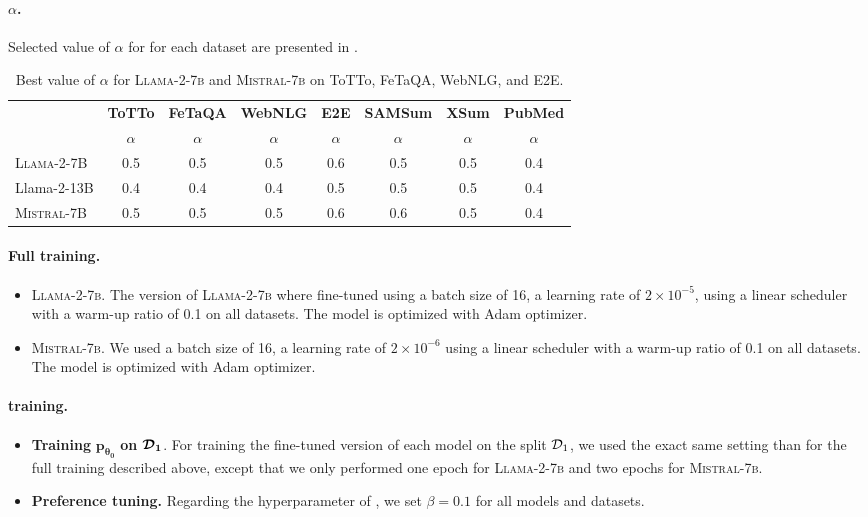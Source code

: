 \paragraph{\scope $\alpha$.} Selected value of $\alpha$ for \scope for each dataset are presented in .
\begin{table}[h!]
\centering

\begin{tabular}{lccccccc}
    & \textbf{ToTTo} & \textbf{FeTaQA} & \textbf{WebNLG} & \textbf{E2E} & \textbf{SAMSum} & \textbf{XSum} & \textbf{PubMed} \\
    & $\alpha$ & $\alpha$ & $\alpha$ & $\alpha$ & $\alpha$ & $\alpha$ & $\alpha$ \\
    \midrule
    \textsc{Llama-2-7B} & 0.5 & 0.5 & 0.5 & 0.6 & 0.5 & 0.5 & 0.4 \\
    Llama-2-13B & 0.4 & 0.4 & 0.4 & 0.5 & 0.5 & 0.5 & 0.4 \\
    \textsc{Mistral-7B} & 0.5 & 0.5 & 0.5 & 0.6 & 0.6 & 0.5 & 0.4 \\
    \midrule
\end{tabular}


\caption{Best \scope value of $\alpha$ for \textsc{Llama-2-7b} and \textsc{Mistral-7b} on ToTTo, FeTaQA, WebNLG, and E2E.}
\label{tab:scope-hyperparameter}
\end{table}

\paragraph{Full \sft training.}
\begin{itemize}
    \item \textsc{Llama-2-7b.} The \sft version of \textsc{Llama-2-7b} where fine-tuned using a batch size of 16, a learning rate of $2\times 10^{-5}$, using a linear scheduler with a warm-up ratio of 0.1 on all datasets. The model is optimized with Adam optimizer.
    \item \textsc{Mistral-7b.} We used a batch size of 16, a learning rate of $2\times 10^{-6}$ using a linear scheduler with a warm-up ratio of 0.1 on all datasets. The model is optimized with Adam optimizer.
\end{itemize}

\paragraph{\scope training.}
\begin{itemize}
    \item \textbf{Training }$\bm{p_{\theta_0}}$\textbf{ on }$\bm{\mathcal{D}_1}$. For training the fine-tuned version of each model on the split $\mathcal{D}_1$, we used the exact same setting than for the full \sft training described above, except that we only performed one epoch for \textsc{Llama-2-7b} and two epochs for \textsc{Mistral-7b}.
    \item \textbf{Preference tuning.} Regarding the hyperparameter of , we set $\beta = 0.1$ for all models and datasets.
\end{itemize}


